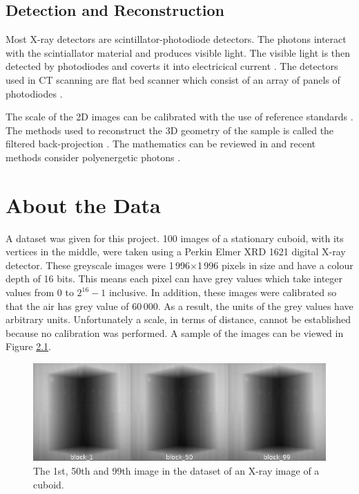 \documentclass[12pt]{report}
\begin{document}
\section{Detection and Reconstruction}
Most X-ray detectors are scintillator-photodiode detectors. The photons interact with the scintiallator material and produces visible light. The visible light is then detected by photodiodes and coverts it into electricical current \cite{michael2001x}. The detectors used in CT scanning are flat bed scanner which consist of an array of panels of photodiodes \cite{cantatore2011introduction}.

The scale of the 2D images can be calibrated with the use of reference standards \cite{bartscher2007enhancement}. The methods used to reconstruct the 3D geometry of the sample is called the filtered back-projection \cite{michael2001x}. The mathematics can be reviewed in \cite{brooks1976principles} and recent methods consider  polyenergetic photons \cite{elbakri2002statistical}.


\chapter{About the Data}\label{chapter:about_the_data}

A dataset was given for this project. 100 images of a stationary cuboid, with its vertices in the middle, were taken using a Perkin Elmer XRD 1621 digital X-ray detector. These greyscale images were 1\,996$\times$1\,996 pixels in size and have a colour depth of 16 bits. This means each pixel can have grey values which take integer values from 0 to $2^{16}-1$ inclusive. In addition, these images were calibrated so that the air has grey value of 60\,000. As a result, the units of the grey values have arbitrary units. Unfortunately a scale, in terms of distance, cannot be established because no calibration was performed. A sample of the images can be viewed in Figure \ref{fig:block_montage}.

\begin{figure}[htp]
\centering
\includegraphics[width=1\textwidth]{figures/block_montage.jpg}
\caption{The 1st, 50th and 99th image in the dataset of an X-ray image of a cuboid.} 
\label{fig:block_montage}
\end{figure}
\end{document}
